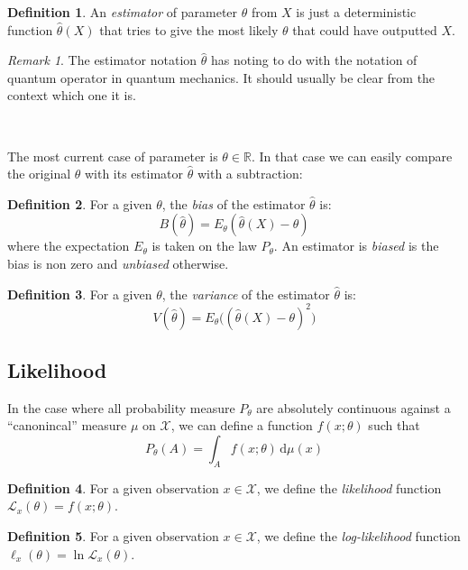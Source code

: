 \documentclass[10pt,a4paper]{report}
\theoremstyle{plain}
\theoremstyle{definition}
\newtheorem{defn}{Definition}[chapter]
\theoremstyle{remark}
\newtheorem*{rem}{Remark}
\newcommand{\R}{\ensuremath{\mathbb{R}}}
\newcommand{\dd}{\mathrm{d}}
\begin{document}
\begin{defn}
  An \emph{estimator} of parameter $\theta$ from $X$ is just a deterministic
  function $\hat \theta(X)$ that tries to give the most likely $\theta$ that
  could have outputted $X$.
\end{defn}

\begin{rem}
  The estimator notation $\hat \theta$ has noting to do with the notation of
  quantum operator in quantum mechanics. It should usually be clear from the
  context which one it is.
\end{rem}

\

The most current case of parameter is $\theta \in \R$. In that case we can
easily compare the original $\theta$ with its estimator $\hat \theta$ with a
subtraction:

\begin{defn}
  For a given $\theta$, the \emph{bias} of the estimator $\hat \theta$ is:
  \[B(\hat{\theta}) = E_\theta(\hat{\theta}(X) - \theta)\]
  where the expectation $E_\theta$ is taken on the law $P_\theta$. An estimator
  is \emph{biased} is the bias is non zero and \emph{unbiased} otherwise.
\end{defn}

\begin{defn}
  For a given $\theta$, the \emph{variance} of the estimator $\hat \theta$ is:
  \[V(\hat{\theta}) = E_\theta\Big({(\hat{\theta}(X) - \theta)}^2\Big)\]
\end{defn}

\subsection{Likelihood}

In the case where all probability measure $P_\theta$ are absolutely
continuous against a ``canonincal'' measure $\mu$ on $\mathcal{X}$, we can
define a function $f(x;\theta)$ such that
\[P_\theta(A) = \int_A f(x;\theta)\,\dd \mu(x)\]

\begin{defn}
  For a given observation $x \in \mathcal{X}$, we define the \emph{likelihood} function
  $\mathcal{L}_x(\theta) = f(x;\theta)$.
\end{defn}

\begin{defn}
  For a given observation $x \in \mathcal{X}$, we define the \emph{log-likelihood} function
  $\ell_x(\theta) = \ln \mathcal{L}_x(\theta)$.
\end{defn}
\end{document}
